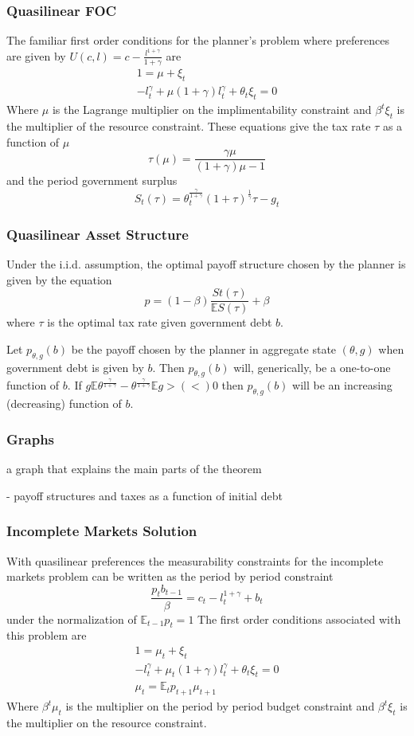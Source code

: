 \documentclass{beamer}
\newcommand{\EE}{\mathbb E}
\begin{document}
\begin{frame}
	\frametitle{Quasilinear FOC}
	The familiar first order conditions for the planner's problem where preferences are given by $U(c,l) = c - \frac{l^{1+\gamma}}{1+\gamma}$ are
	\begin{align*}
		1 = \mu +\xi_t\\
		-l_t^\gamma+\mu(1+\gamma)l_t^\gamma+\theta_t\xi_t = 0
	\end{align*}Where $\mu$ is the Lagrange multiplier on the implimentability constraint and $\beta^t\xi_t$ is the multiplier of the resource constraint.   These equations give the tax rate $\tau$ as a function of $\mu$
	\[
		\tau(\mu) = \frac{\gamma\mu}{(1+\gamma)\mu-1}
	\] and the period government surplus 
	\[
		S_t(\tau) = \theta_t^\frac\gamma{1+\gamma}(1+\tau)^\frac1\gamma\tau-g_t
	\]
\end{frame}

\begin{frame}
	\frametitle{Quasilinear Asset Structure}
	Under the i.i.d. assumption, the optimal payoff structure chosen by the planner is given by the equation
	\[
		p = (1-\beta)\frac{St(\tau)}{\EE S(\tau)} + \beta
	\]where $\tau$ is the optimal tax rate given government debt $b$. 
	\begin{lemma}  Let $p_{\theta,g}(b)$ be the payoff chosen by the planner in aggregate state $(\theta,g)$ when government debt is given by $b$.  Then $p_{\theta,g}(b)$ will, generically, be a one-to-one function of $b$.  If $g\EE\theta^\frac{\gamma}{1+\gamma}-\theta^\frac{\gamma}{1+\gamma}\EE g > (<) 0$ then $p_{\theta,g}(b)$ will be an increasing (decreasing) function of $b$. 
	\end{lemma}
\end{frame}

  \begin{frame}
   \frametitle{Graphs }
    a graph that explains the main parts of the theorem
   
   - payoff structures and taxes as a function of initial debt
  \end{frame}

  
  
\begin{frame}
 	\frametitle{Incomplete Markets Solution}
	With quasilinear preferences the measurability constraints for the incomplete markets problem can be written as the period by period constraint
	\[
		\frac{p_t b_{t-1}}\beta = c_t - l_t^{1+\gamma} + b_t 
	\]under the normalization of $\EE_{t-1} p_t = 1$  The first order conditions associated with this problem are
	\begin{align*}
		1 = \mu_t + \xi_t\\
		-l_t^\gamma+\mu_t(1+\gamma)l_t^\gamma+\theta_t\xi_t = 0\\
		\mu_t = \EE_t p_{t+1}\mu_{t+1}
	\end{align*}  Where $\beta^t\mu_t$ is the multiplier on the period by period budget constraint and $\beta^t\xi_t$ is the multiplier on the resource constraint.
\end{frame}
\end{document}
